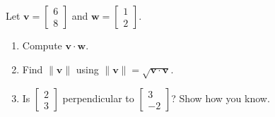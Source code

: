 \documentclass[10pt]{article}
\newcommand{\vv}{\mathbf{v}}
\newcommand{\ww}{\mathbf{w}}
\begin{document}
\boxguard
\begin{practicebox}
Let $\vv = \begin{bmatrix} 6 \\ 8 \end{bmatrix}$ and $\ww = \begin{bmatrix} 1 \\ 2 \end{bmatrix}$.
\begin{enumerate}[leftmargin=1.6em]
  \item Compute $\vv\cdot\ww$. \hfill \blank{4.0cm}
  \item Find $\|\vv\|$ using $\|\vv\|=\sqrt{\vv\cdot\vv}$. \hfill \blank{4.0cm}
  \item Is $\begin{bmatrix} 2 \\ 3 \end{bmatrix}$ perpendicular to $\begin{bmatrix} 3 \\ -2 \end{bmatrix}$?
        Show how you know. \writeline
\end{enumerate}
\end{practicebox}
\end{document}
